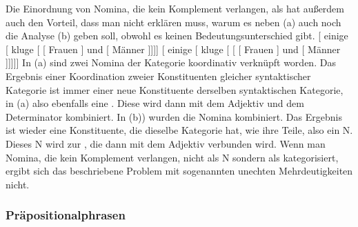 Die Einordnung von Nomina, die kein Komplement verlangen, als \nbar hat außerdem auch den Vorteil,
dass man nicht erklären muss, warum es neben (a) auch noch die Analyse (b) geben soll, obwohl es
keinen Bedeutungsunterschied gibt.
\eal
\ex {}[ einige [\sub{\nbar} kluge [\sub{\nbar} [\sub{\nbar} Frauen ] und [\sub{\nbar} Männer
]]]]
\ex {}[ einige [\sub{\nbar} kluge [\sub{\nbar} [ [ Frauen ] und [ Männer
]]]]]
\zl
In (a) sind zwei Nomina der Kategorie \nbar koordinativ verknüpft worden. Das Ergebnis einer
Koordination zweier Konstituenten gleicher syntaktischer Kategorie ist immer einer neue Konstituente
derselben syntaktischen Kategorie, in (a) also ebenfalls eine \nbar. Diese wird dann mit dem
Adjektiv und dem Determinator kombiniert.
In (b)) wurden die Nomina kombiniert. Das Ergebnis ist wieder eine Konstituente, die dieselbe
Kategorie hat, wie ihre Teile, also ein N. Dieses N wird zur \nbar, die dann mit dem Adjektiv
verbunden wird. Wenn man Nomina, die kein Komplement verlangen, nicht als N sondern als \nbar
kategorisiert, ergibt sich das beschriebene Problem mit sogenannten unechten Mehrdeutigkeiten
nicht. 

\fi

\subsubsection{Präpositionalphrasen}



